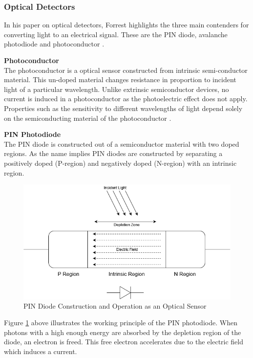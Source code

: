 \subsubsection{Optical Detectors}
In his paper on optical detectors, Forrest highlights the three main contenders for converting light to an electrical signal. These are the PIN diode, avalanche photodiode and photoconductor \cite{Forrest1986}.

\textbf{Photoconductor}\\
The photoconductor is a optical sensor constructed from intrinsic semi-conductor material. This un-doped material changes resistance in proportion to incident light of a particular wavelength. Unlike extrinsic semiconductor devices, no current is induced in a photoconductor as the photoelectric effect does not apply. Properties such as the sensitivity to different wavelengths of light depend solely on the semiconducting material of the photoconductor \cite{Kingston2003}.

\textbf{PIN Photodiode}\\
The PIN diode is constructed out of a semiconductor material with two doped regions. As the name implies PIN diodes are constructed by separating a positively doped (P-region) and negatively doped (N-region) with an intrinsic region.

\begin{figure}[H]
	\centering
	\includegraphics[width=0.8\linewidth]{figures/litreview/pin_diode_diagram.png}
	\caption{PIN Diode Construction and Operation as an Optical Sensor}
	\label{fig:pin_diode_diagram}
\end{figure}

Figure \ref{fig:pin_diode_diagram} above illustrates the working principle of the PIN photodiode.
When photons with a high enough energy are absorbed by the depletion region of the diode, an electron is freed. This free electron accelerates due to the electric field which induces a current.

